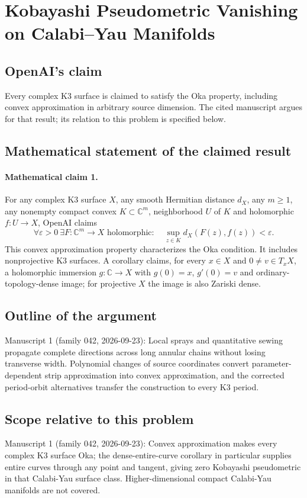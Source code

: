 \documentclass[11pt]{article}
\begin{document}
\section*{Kobayashi Pseudometric Vanishing on Calabi–Yau Manifolds}

\subsection{OpenAI's claim}
Every complex K3 surface is claimed to satisfy the Oka property, including convex approximation in arbitrary source dimension. The cited manuscript argues for that result; its relation to this problem is specified below.

\subsection{Mathematical statement of the claimed result}
\paragraph{Mathematical claim 1.} For any complex K3 surface $X$, any smooth Hermitian distance $d_X$, any $m\ge1$, any nonempty compact convex $K\subset\mathbb C^m$, neighborhood $U$ of $K$ and holomorphic $f:U\to X$, OpenAI claims
\[
\forall\varepsilon>0\ \exists F:\mathbb C^m\to X\text{ holomorphic}:\quad\sup_{z\in K}d_X(F(z),f(z))<\varepsilon.
\]
This convex approximation property characterizes the Oka condition. It includes nonprojective K3 surfaces. A corollary claims, for every $x\in X$ and $0\ne v\in T_xX$, a holomorphic immersion $g:\mathbb C\to X$ with $g(0)=x$, $g'(0)=v$ and ordinary-topology-dense image; for projective $X$ the image is also Zariski dense.

\subsection{Outline of the argument}
Manuscript 1 (family 042, 2026-09-23): Local sprays and quantitative sewing propagate complete directions across long annular chains without losing transverse width. Polynomial changes of source coordinates convert parameter-dependent strip approximation into convex approximation, and the corrected period-orbit alternatives transfer the construction to every K3 period.

\subsection{Scope relative to this problem}
Manuscript 1 (family 042, 2026-09-23): Convex approximation makes every complex K3 surface Oka; the dense-entire-curve corollary in particular supplies entire curves through any point and tangent, giving zero Kobayashi pseudometric in that Calabi-Yau surface class. Higher-dimensional compact Calabi-Yau manifolds are not covered.
\end{document}
